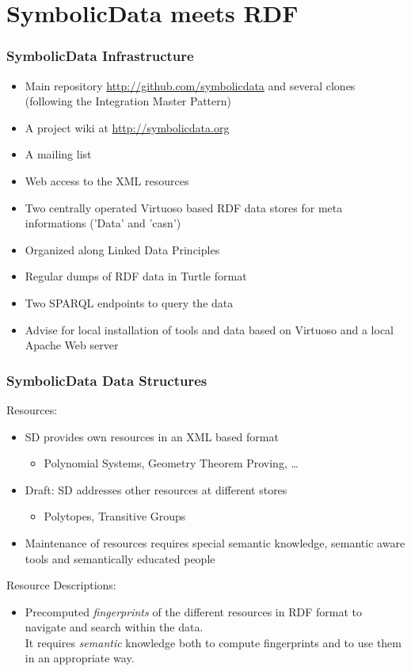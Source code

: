 \documentclass{beamer}
\begin{document}
\section{SymbolicData meets RDF}
\begin{frame}\frametitle{SymbolicData Infrastructure}
\begin{itemize}
\item Main repository \url{http://github.com/symbolicdata} and several clones
  (following the Integration Master Pattern)
\item A project wiki at \url{http://symbolicdata.org}
\item A mailing list
\item Web access to the XML resources
\item Two centrally operated Virtuoso based RDF data stores for meta
  informations ('Data' and 'casn')
\item Organized along Linked Data Principles
\item Regular dumps of RDF data in Turtle format
\item Two SPARQL endpoints to query the data
\item Advise for local installation of tools and data based on Virtuoso and a
  local Apache Web server
\end{itemize}
\end{frame}

\begin{frame}\frametitle{SymbolicData Data Structures}
Resources:
\begin{itemize}
\item SD provides own resources in an XML based format
\begin{itemize}
\item Polynomial Systems, Geometry Theorem Proving, \ldots
\end{itemize}
\item Draft: SD addresses other resources at different stores
\begin{itemize}
\item Polytopes, Transitive Groups
\end{itemize}
\item Maintenance of resources requires special semantic knowledge, semantic
  aware tools and semantically educated people
\end{itemize}
Resource Descriptions: 
\begin{itemize}
\item Precomputed \emph{fingerprints} of the different resources in RDF format
  to navigate and search within the data.\\ It requires \emph{semantic}
  knowledge both to compute fingerprints and to use them in an appropriate
  way.
\end{itemize}
\end{frame}
\end{document}
